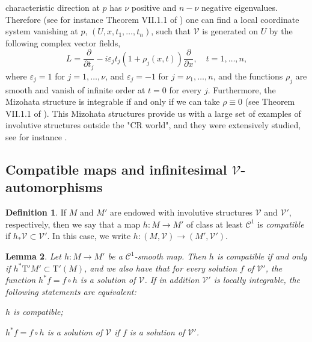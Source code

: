 \documentclass[11pt]{amsart}
\newcommand{\crb}{\mathcal{V}}
\newcommand{\diffable}[1]{\mathcal{C}^{#1}}
\newcommand{\holforms}{\mathrm{T}'}
\renewcommand{\epsilon}{\varepsilon}
\theoremstyle{definition}
\newtheorem{defn}{Definition}[section]
\theoremstyle{remark}
\theoremstyle{plain}
\newtheorem{lem}[defn]{Lemma}
\begin{document}
characteristic direction at $p$ has $\nu$ positive and $n - \nu$
negative eigenvalues. Therefore (see for instance Theorem VII.1.1 of
\cite{trevesbook}) one can find a local coordinate system vanishing at
$p$, $(U, x, t_1, \dots, t_n)$, such that $\mathcal{V}$ is generated
on $U$ by the following complex vector fields,
%
\begin{equation*}
  L = \frac{\partial}{\partial t_j} - i\epsilon_jt_j(1+\rho_j(x,t))\frac{\partial}{\partial x}, \quad t = 1, \dots, n,
\end{equation*}
%
where $\epsilon_j = 1$ for $j = 1, \dots, \nu$, and $\epsilon_j = -1$
for $j = \nu_1, \dots, n$, and the functions $\rho_j$ are smooth and
vanish of infinite order at $t=0$ for every $j$. Furthermore, the
Mizohata structure is integrable if and only if we can take
$\rho \equiv 0$ (see Theorem VII.1.1 of \cite{trevesbook}). This
Mizohata structures provide us with a large set of examples of
involutive structures outside the "CR world", and they were
extensively studied, see for instance
\cite{hounie1992,hounie1993,hounie1997,meziani1995,meziani1997,meziani1999,jacobowitz1993,sjostrand1980}
.
\subsection{Compatible maps and infinitesimal $\mathcal{V}$-automorphisms}

\begin{defn}
  \label{def:compatible} If $M$ and $M'$ are endowed with involutive structures $\crb$ and $\crb'$,
  respectively, then we say that a map $h\colon M\to M'$ of class at least $\diffable{1}$ is
  {\em compatible} if $h_* \crb \subset \crb'$. In this case, we write $h\colon (M,\crb) \to (M',\crb')$. 
\end{defn}

\begin{lem}
  \label{lem:compatible} Let $h\colon M\to M'$ be a $\diffable{1}$-smooth  map. Then $h$ is
  compatible if and only if $h^* \holforms{M'} \subset \holforms(M)$, and we also have
  that for every solution $f$ of $\crb'$, the
  function $h^*f = f\circ h$ is a solution of $\crb$. If in addition
  $\crb'$ is locally integrable,  the following statements are equivalent:
  \begin{compactenum}
  \item $h$ is compatible;
    \item $h^*f = f\circ h$ is a solution of $\crb$ if $f$ is a solution of $\crb'$. 
  \end{compactenum}
\end{lem}
\end{document}
